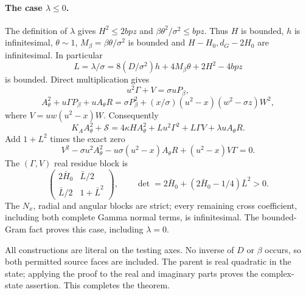 \documentclass[10pt,a4paper]{article}
\begin{document}
\paragraph{The case $\lambda\le0$.}
The definition of $\lambda$ gives
$H^2\le2bpz$ and $\beta\theta^2/\sigma^2\le bpz$.
Thus $H$ is bounded, $h$ is infinitesimal, $\theta\sim1$,
$M_\beta=\beta\theta/\sigma^2$ is bounded and
$H-H_0,d_G-2H_0$ are infinitesimal. In particular
\[
 L=\lambda/\sigma
   =8(D/\sigma^2)h+4M_\beta\theta+2H^2-4bpz
\]
is bounded. Direct multiplication gives
\[
 u^2\Gamma+V=\sigma uP_\beta,
\]
\[
 A_\theta^2+u\Gamma P_\beta+uA_\theta R
      =\sigma P_\beta^2+(x/\sigma)(u^2-x)(w^2-\sigma z)W^2,
\]
where $V=uw(u^2-x)W$. Consequently
\[
 K_AA_\theta^2+\mathscr S
 =4\kappa H A_\theta^2+Lu^2\Gamma^2+L\Gamma V
                                      +\lambda uA_\theta R.
\]
Add $1+L^2$ times the exact zero
\[
 V^2-\sigma u^2A_\theta^2-u\sigma(u^2-x)A_\theta R
                                      +(u^2-x)V\Gamma=0.
\]
The $(\Gamma,V)$ real residue block is
\[
 \begin{pmatrix}2\bar H_0&\bar L/2\\
                 \bar L/2&1+\bar L^2\end{pmatrix},\qquad
 \det=2\bar H_0+(2\bar H_0-1/4)\bar L^2>0.
\]
The $N_x$, radial and angular blocks are strict; every remaining
cross coefficient, including both complete Gamma normal terms,
is infinitesimal. The bounded-Gram fact proves this case, including
$\lambda=0$.

All constructions are literal on the testing axes. No inverse of
$D$ or $\beta$ occurs, so both permitted source faces are included.
The parent is real quadratic in the state; applying the proof to
the real and imaginary parts proves the complex-state assertion.
This completes the theorem.
\end{document}
